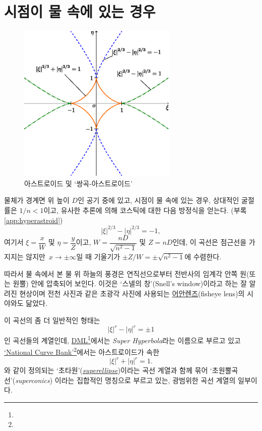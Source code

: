 \documentclass[twocolumn]{article}
\begin{document}
\section{시점이 물 속에 있는 경우}

\begin{figure}
	\centering
	\includegraphics[width=3in]{figs/g254.eps}
	\caption{아스트로이드 및 `쌍곡-아스트로이드'}
	\label{fig:hyperastroid}
\end{figure}

물체가 경계면 위 높이 $D$인 공기 중에 있고, 
시점이 물 속에 있는 경우, 상대적인 굴절률은 $1/n < 1$이고, 
유사한 추론에 의해 코스틱에 대한 다음 방정식을 얻는다. (부록 \ref{app:hyperastroid})
$$ \left| \xi \right|^{2/3} - \left| \eta \right|^{2/3} = -1, $$
여기서 $\xi = \dfrac{x}{W} $ 및 $\eta = \dfrac{y}{Z}$이고, 
$W = \dfrac{nD}{\sqrt{n^2-1}}$ 및 $Z = nD$인데,  
이 곡선은 점근선을 가지지는 않지만 $x\rightarrow\pm\infty$일 때 
기울기가 $\pm Z/W = \pm \sqrt{n^2-1}$에 수렴한다.

따라서 물 속에서 본 물 위 하늘의 풍경은
연직선으로부터 전반사의 임계각 안쪽 원(또는 원뿔) 안에 압축되어 보인다. 이것은 
`스넬의 창'(Snell's window)이라고 하는 잘 알려진 현상이며 전천 사진과 같은 초광각 
사진에 사용되는 \href{https://ko.wikipedia.org/wiki/%EC%96%B4%EC%95%88_%EB%A0%8C%EC%A6%88}{어안렌즈}(fisheye lens)의 시야와도 닮았다.

이 곡선의 좀 더 일반적인 형태는 
$$ \left| \xi \right|^{r} - \left| \eta \right|^{r} = \pm1 $$
인 곡선들의 계열인데, \href{http://dynamicmathematicslearning.com/super-ellipse.html}%
{DML}\footnote{}에서는 \emph{Super Hyperbola}라는 이름으로 부르고 있고 
\href{https://old.nationalcurvebank.org/superconicncb/superconicncb.htm}{`National Curve Bank'}\footnote{}에서는
아스트로이드가 속한 
$$ \left| \xi \right|^{r} + \left| \eta \right|^{r} = 1. $$
와 같이 정의되는 `초타원'(\href{https://mathworld.wolfram.com/Astroid.html}%
{\emph{superellipse}})이라는 곡선 계열과 함께 묶어
`초원뿔곡선'(\emph{superconics}) 이라는 집합적인 명칭으로 부르고 있는, 광범위한 곡선 계열의 일부이다.
\end{document}
